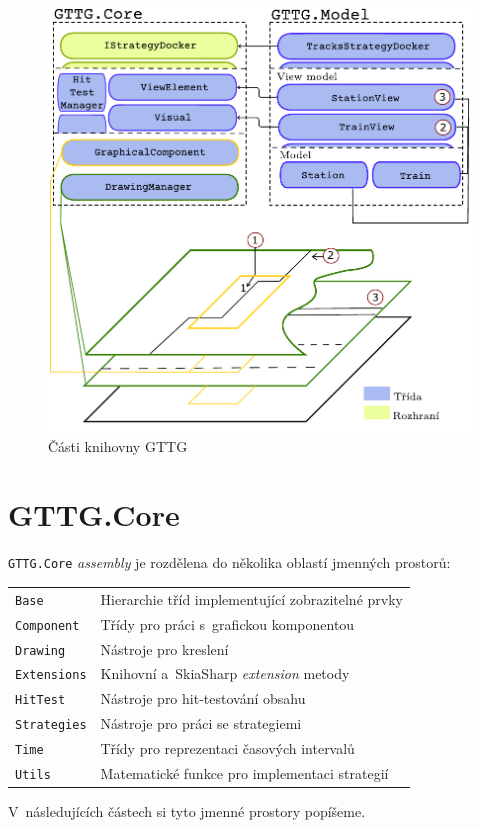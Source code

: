 \begin{figure}[!hbt]
	\centering
	\includegraphics[width=.85\textwidth]{../img/kap4_gttg-lib-structure}
	\caption{Části knihovny GTTG}
	\label{fig:kap4:gttg_lib_structure}
\end{figure}

\section{GTTG.Core}
\texttt{GTTG.Core} \textit{assembly} je rozdělena do několika oblastí jmenných prostorů:

\begin{tabular}{ m{} m{} }
\texttt{Base} & Hierarchie tříd implementující zobrazitelné prvky \\
\texttt{Component} & Třídy pro práci s~grafickou komponentou \\ 
\texttt{Drawing} & Nástroje pro kreslení \\
\texttt{Extensions} & Knihovní a~SkiaSharp \textit{extension} metody \\
\texttt{HitTest} & Nástroje pro hit-testování obsahu \\
\texttt{Strategies} & Nástroje pro práci se strategiemi \\
\texttt{Time} & Třídy pro reprezentaci časových intervalů \\
\texttt{Utils} & Matematické funkce pro implementaci strategií
\end{tabular}
\newline
\newline
V~následujících částech si tyto jmenné prostory popíšeme.

